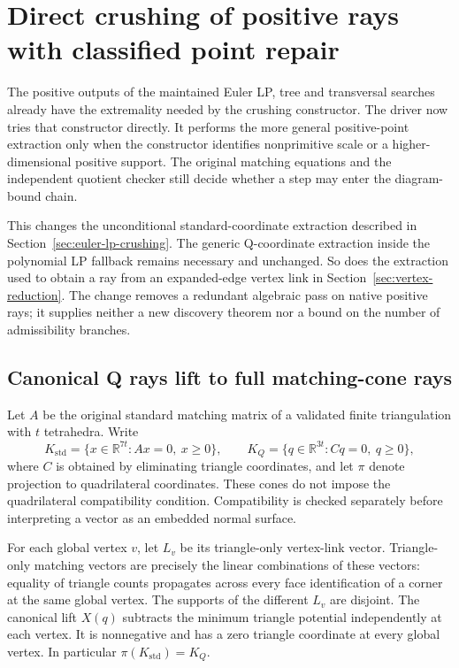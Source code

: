 \section{Direct crushing of positive rays with classified point repair}
\label{sec:direct-crush-positive}

The positive outputs of the maintained Euler LP, tree and transversal
searches already have the extremality needed by the crushing constructor.
The driver now tries that constructor directly.  It performs the more
general positive-point extraction only when the constructor identifies
nonprimitive scale or a higher-dimensional positive support.  The original
matching equations and the independent quotient checker still decide
whether a step may enter the diagram-bound chain.

This changes the unconditional standard-coordinate extraction described in
Section~\ref{sec:euler-lp-crushing}.  The generic Q-coordinate extraction
inside the polynomial LP fallback remains necessary and unchanged.  So does
the extraction used to obtain a ray from an expanded-edge vertex link in
Section~\ref{sec:vertex-reduction}.  The change removes a redundant algebraic
pass on native positive rays; it supplies neither a new discovery theorem
nor a bound on the number of admissibility branches.

\subsection{Canonical Q rays lift to full matching-cone rays}

Let $A$ be the original standard matching matrix of a validated finite
triangulation with $t$ tetrahedra.  Write
\[
 K_{\mathrm{std}}=\{x\in\mathbb R^{7t}:Ax=0,\ x\ge0\},
 \qquad K_Q=\{q\in\mathbb R^{3t}:Cq=0,\ q\ge0\},
\]
where $C$ is obtained by eliminating triangle coordinates, and let $\pi$
denote projection to quadrilateral coordinates.  These cones do not impose
the quadrilateral compatibility condition.  Compatibility is checked
separately before interpreting a vector as an embedded normal surface.

For each global vertex $v$, let $L_v$ be its triangle-only vertex-link
vector.  Triangle-only matching vectors are precisely the linear
combinations of these vectors: equality of triangle counts propagates
across every face identification of a corner at the same global vertex.
The supports of the different $L_v$ are disjoint.  The canonical lift
$X(q)$ subtracts the minimum triangle potential independently at each
vertex.  It is nonnegative and has a zero triangle coordinate at every
global vertex.  In particular $\pi(K_{\mathrm{std}})=K_Q$.

